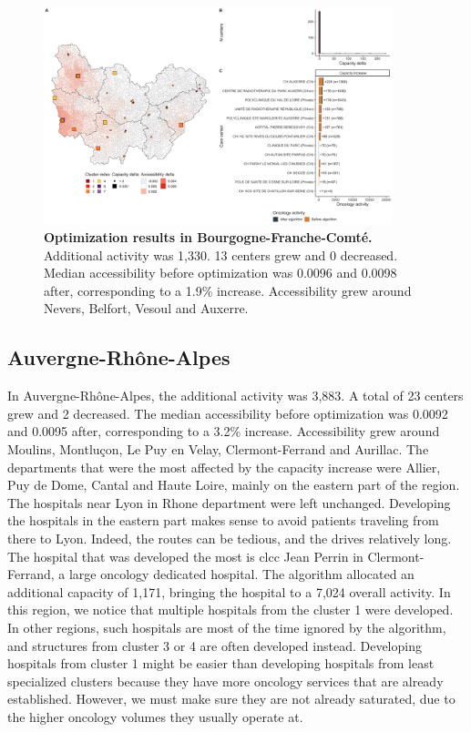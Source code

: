 \begin{figure}[H]
    \includegraphics[width=0.9\textwidth]{images/camion/optim_region/optim_Bourgogne-Franche-Comte.png}
    \centering
    \caption{ \textbf{Optimization results in Bourgogne-Franche-Comté.}
        Additional activity was 1,330. 13 centers grew and 0 decreased. Median
        accessibility before optimization was 0.0096 and 0.0098 after,
        corresponding to a 1.9\% increase. Accessibility grew around Nevers,
        Belfort, Vesoul and Auxerre. }
\end{figure}

\subsection*{Auvergne-Rhône-Alpes}

In Auvergne-Rhône-Alpes, the additional activity was 3,883. A total of 23
centers grew and 2 decreased. The median accessibility before optimization was
0.0092 and 0.0095 after, corresponding to a 3.2\% increase. Accessibility grew
around Moulins, Montluçon, Le Puy en Velay, Clermont-Ferrand and Aurillac. The
departments that were the most affected by the capacity increase were Allier,
Puy de Dome, Cantal and Haute Loire, mainly on the eastern part of the region.
The hospitals near Lyon in Rhone department were left unchanged. Developing
the hospitals in the eastern part makes sense to avoid patients traveling from
there to Lyon. Indeed, the routes can be tedious, and the drives relatively
long. The hospital that was developed the most is \ac{clcc} Jean Perrin in
Clermont-Ferrand, a large oncology dedicated hospital. The algorithm allocated
an additional capacity of 1,171, bringing the hospital to a 7,024 overall
activity. In this region, we notice that multiple hospitals from the cluster 1
were developed. In other regions, such hospitals are most of the time ignored
by the algorithm, and structures from cluster 3 or 4 are often developed instead.
Developing hospitals from cluster 1 might be easier than developing hospitals
from least specialized clusters because they have more oncology services that
are already established. However, we must make sure they are not already
saturated, due to the higher oncology volumes they usually operate at.

